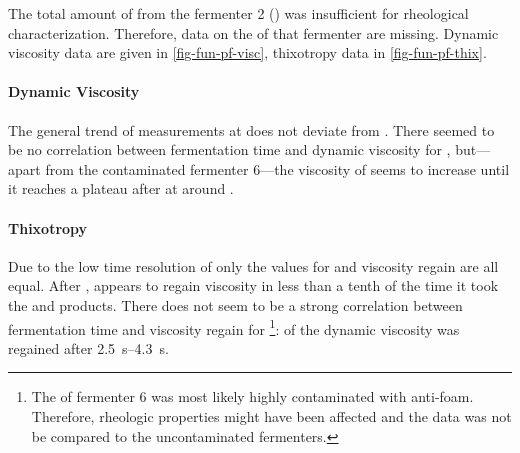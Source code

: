 The total amount of \eps{} from the  fermenter 2 (\comm{}) was insufficient for rheological characterization. Therefore, data on the \eps{} of that fermenter are missing. Dynamic viscosity data are given in \vref{fig-fun-pf-visc}, thixotropy data in \vref{fig-fun-pf-thix}.

\paragraph{Dynamic Viscosity}
The general trend of measurements at  does not deviate from . There seemed to be no correlation between fermentation time and dynamic viscosity for \rolf{}, but---apart from the contaminated fermenter 6---the viscosity of \shz{} seems to increase until it reaches a plateau after  at around .

\paragraph{Thixotropy}
Due to the low time resolution of only  the values for  and  viscosity regain are all equal. After , \scl{} appears to regain viscosity in less than a tenth of the time it took the  and  products. There does not seem to be a strong correlation between fermentation time and viscosity regain for \shz{}\footnote{The \eps{} of fermenter 6 was most likely highly contaminated with anti-foam. Therefore, rheologic properties might have been affected and the data was not be compared to the uncontaminated fermenters.}:  of the dynamic viscosity was regained after \SIrange{2.5}{4.3}{\second}.

